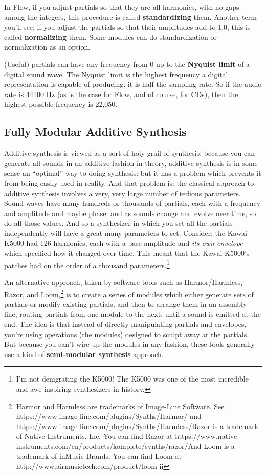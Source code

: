 \documentclass{article}
\newcommand\name{Flow}
\begin{document}
In {\name}, if you adjust partials so that they are all harmonics, with no gaps among the integers, this procedure is called {\bf standardizing} them.  Another term you'll see: if you adjust the partials so that their amplitudes add to 1.0, this is called {\bf normalizing} them.  Some modules can do standardization or normalization as an option.

(Useful) partials can have any frequency from 0 up to the {\bf Nyquist limit} of a digital sound wave.  The Nyquist limit is the highest frequency a digital representation is capable of producing: it is half the sampling rate.  So if the audio rate is 44100 Hz (as is the case for {\name}, and of course, for CDs), then the highest possible frequency is 22,050.

\subsection{Fully Modular Additive Synthesis}  Additive synthesis is viewed as a sort of holy grail of synthesis: because you can generate all sounds in an additive fashion in theory, additive synthesis is in some sense an ``optimal'' way to doing synthesis: but it has a problem which prevents it from being easily used in reality.   And that problem is: the classical approach to additive synthesis involves a very, very large number of tedious parameters.  Sound waves have many hundreds or thousands of partials, each with a frequency and amplitude and maybe phase: and as sounds change and evolve over time, so do all those values.  And so a synthesizer in which you set all the partials independently will have a great many parameters to set.  Consider: the Kawai K5000 had 126 harmonics, each with a base amplitude and {\it its own envelope} which specified how it changed over time.  This meant that the Kawai K5000's patches had on the order of a thousand parameters.\footnote{I'm not denigrating the K5000!  The K5000 was one of the most incredible and awe-inspiring synthesizers in history.}

An alternative approach, taken by software tools such as Harmor/Harmless, Razor, and Loom,\footnote{Harmor and Harmless are trademarks of Image-Line Software.  See https:/\!/www.image-line.com/plugins/Synths/Harmor/  and https:/\!/www.image-line.com/plugins/Synths/Harmless/\qquad Razor is a trademark of Native Instruments, Inc.  You can find Razor at https:/\!/www.native-instruments.com/en/products/komplete/synths/razor/\qquad And Loom is a trademark of inMusic Brands.  You can find Loom at http:/\!/www.airmusictech.com/product/loom-ii}
is to create a series of modules which either generate sets of partials or modify existing partials, and then to arrange them in an assembly line, routing partials from one module to the next, until a sound is emitted at the end.  The idea is that instead of directly manipulating partials and envelopes, you're using operations (the modules) designed to sculpt away at the partials.  But because you can't wire up the modules in any fashion, these tools generally use a kind of {\bf semi-modular synthesis} approach.  
\end{document}
